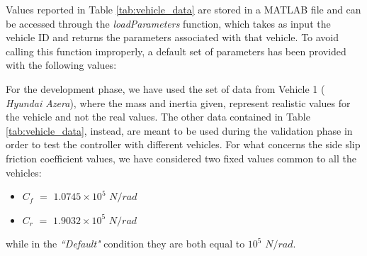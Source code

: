 \begin{table}[H]
\caption{Vehicle data considered for development and validation}
\label{tab:vehicle_data}
\end{table}
Values reported in Table \ref{tab:vehicle_data} are stored in a MATLAB file and can be accessed through the \textit{loadParameters} function, which takes as input the vehicle ID and returns the parameters associated with that vehicle. To avoid calling  this function improperly, a default set of parameters has been provided with the following values:
\begin{table}[H]
\end{table}
For the development phase, we have used the set of data from Vehicle 1 ( \textit{Hyundai Azera}), where the mass and inertia given, represent realistic values for the vehicle and not the real values. The other data contained in Table \ref{tab:vehicle_data}, instead, are meant to be used during the validation phase in order to test the controller with different vehicles.
For what concerns the side slip friction coefficient values, we have considered two fixed values common to all the vehicles:
\begin{itemize}
    \item $C_f$ $=$ $1.0745\times10^5$ $N/rad$
    \item $C_r$ $=$ $1.9032\times10^5$ $N/rad$
\end{itemize}
while in the \textit{``Default"} condition they are both equal to $10^5$ $N/rad$.

